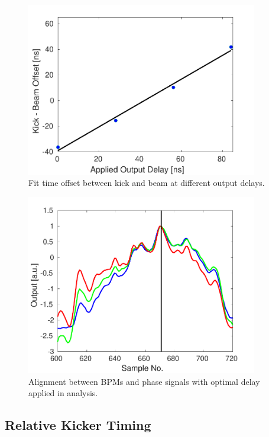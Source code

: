 \begin{figure}
  \centering
  \includegraphics[width=0.9\textwidth]{Figures/commissioning/absTimBeam_fit}
  \caption{Fit time offset between kick and beam at different output delays.}
  \label{f:absTimBeam_fit}
\end{figure}

\begin{figure}
  \centering
  \includegraphics[width=0.9\textwidth]{Figures/commissioning/absTimBeam_opt}
  \caption{Alignment between BPMs and phase signals with optimal delay applied in analysis.}
  \label{f:absTimBeam_opt}
\end{figure}


\subsection{Relative Kicker Timing}
\label{ss:relativeTiming}

